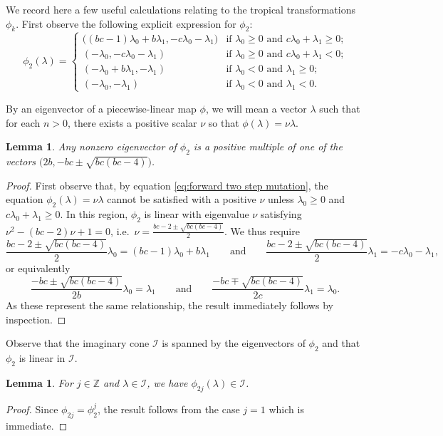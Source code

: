 \documentclass{amsart}
\newtheorem{lemma}[theorem]{Lemma}
\numberwithin{theorem}{section}
\newcommand{\cI}{\mathcal{I}}
\newcommand{\ZZ}{\mathbb{Z}}
\begin{document}
  We record here a few useful calculations relating to the tropical transformations $\phi_k$.
  First observe the following explicit expression for $\phi_2$:
  \begin{equation}
    \label{eq:forward two step mutation}
    \phi_2(\lambda)
    =
    \begin{cases}
      \big((bc-1)\lambda_0+b\lambda_1, -c\lambda_0-\lambda_1\big) & \text{if $\lambda_0\ge 0$ and $c\lambda_0+\lambda_1\ge 0$;}\\
      (-\lambda_0, -c\lambda_0-\lambda_1) & \text{if $\lambda_0\ge 0$ and $c\lambda_0+\lambda_1<0$;}\\
      (-\lambda_0+b\lambda_1, -\lambda_1) & \text{if $\lambda_0<0$ and $\lambda_1\ge 0$;}\\
      (-\lambda_0,-\lambda_1) & \text{if $\lambda_0<0$ and $\lambda_1<0$.}
    \end{cases}
  \end{equation}

  By an eigenvector of a piecewise-linear map $\phi$, we will mean a vector $\lambda$ such that for each $n>0$, there exists a positive scalar $\nu$ so that $\phi(\lambda)=\nu\lambda$.
  \begin{lemma}
    Any nonzero eigenvector of $\phi_2$ is a positive multiple of one of the vectors $\big(2b,-bc\pm\sqrt{bc(bc-4)}\big)\!$.
  \end{lemma}
  \begin{proof}
    First observe that, by equation \eqref{eq:forward two step mutation}, the equation $\phi_2(\lambda)=\nu\lambda$ cannot be satisfied with a positive $\nu$ unless $\lambda_0\ge 0$ and $c\lambda_0+\lambda_1\ge 0$.
    In this region, $\phi_2$ is linear with eigenvalue $\nu$ satisfying $\nu^2-(bc-2)\nu+1=0$, i.e.~$\nu=\frac{bc-2\pm\sqrt{bc(bc-4)}}{2}$.
    We thus require 
    \[\frac{bc-2\pm\sqrt{bc(bc-4)}}{2}\lambda_0=(bc-1)\lambda_0+b\lambda_1 \qquad\text{and}\qquad \frac{bc-2\pm\sqrt{bc(bc-4)}}{2}\lambda_1= -c\lambda_0-\lambda_1,\]
    or equivalently
    \[\frac{-bc\pm\sqrt{bc(bc-4)}}{2b}\lambda_0=\lambda_1 \qquad\text{and}\qquad \frac{-bc\mp\sqrt{bc(bc-4)}}{2c}\lambda_1=\lambda_0.\]
    As these represent the same relationship, the result immediately follows by inspection.
  \end{proof}

  Observe that the imaginary cone $\cI$ is spanned by the eigenvectors of $\phi_{2}$ and that $\phi_{2}$ is linear in $\cI$.
  \begin{lemma}
    \label{le:imaginary stability}
    For $j\in\ZZ$ and $\lambda\in\cI$, we have $\phi_{2j}(\lambda)\in\cI$.
  \end{lemma}
  \begin{proof}
    Since $\phi_{2j}=\phi_2^j$, the result follows from the case $j=1$ which is immediate.
  \end{proof}
\end{document}
